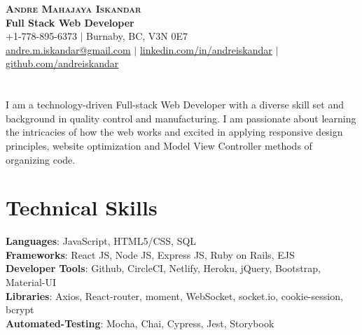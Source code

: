 \documentclass[letterpaper,11pt]{article}
\begin{document}

\begin{center}
    \textbf{\Huge \scshape Andre Mahajaya Iskandar} \\ \vspace{5pt}
    \textbf{\large Full Stack Web Developer}\vspace{5pt} \\
    \small \faPhoneSquare{ }+1-778-895-6373 $|$ \faHome{ }Burnaby, BC, V3N 0E7 \\
    \href{mailto:andre.m.iskandar@gmail.com}{\faEnvelope{ }andre.m.iskandar@gmail.com} $|$ 
    \href{https://linkedin.com/in/andreiskandar}{\faLinkedin{ }linkedin.com/in/andreiskandar} $|$
    \href{https://github.com/andreiskandar}{\faGithub{ }github.com/andreiskandar} \vspace{-10pt}
\end{center}

\section{}
I am a technology-driven Full-stack Web Developer with a diverse skill set and background in quality control and manufacturing. I am passionate about learning the intricacies of how the web works and excited in applying responsive design principles, website optimization and Model View Controller methods of organizing code. 

\section{Technical Skills}


 \begin{itemize}[leftmargin=0.15in, label={}]
    \small{\item{
     \textbf{Languages}{: JavaScript, HTML5/CSS, SQL} \\
     \textbf{Frameworks}{: React JS, Node JS, Express JS, Ruby on Rails, EJS} \\
     \textbf{Developer Tools}{: Github, CircleCI, Netlify, Heroku, jQuery, Bootstrap, Material-UI} \\
     \textbf{Libraries}{: Axios, React-router, moment, WebSocket, socket.io, cookie-session, bcrypt } \\
     \textbf{Automated-Testing}{: Mocha, Chai, Cypress, Jest, Storybook }
    }}
 \end{itemize}
\end{document}
